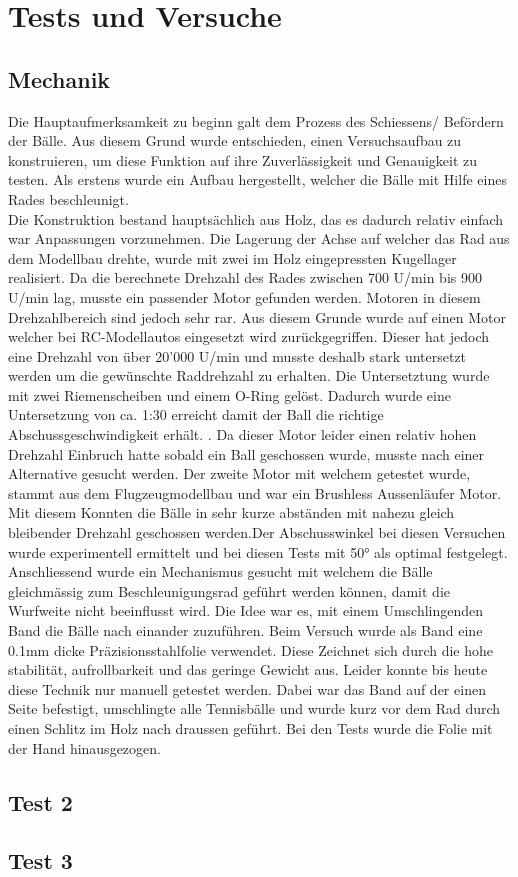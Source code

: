 \section{Tests und Versuche}

\subsection{Mechanik}


Die Hauptaufmerksamkeit zu beginn galt dem Prozess des Schiessens/ Befördern der Bälle. Aus diesem Grund wurde entschieden, einen Versuchsaufbau zu konstruieren, um diese Funktion auf ihre Zuverlässigkeit und Genauigkeit zu testen. Als erstens wurde ein Aufbau hergestellt, welcher die Bälle mit Hilfe eines Rades beschleunigt.
%
%
\\Die Konstruktion bestand hauptsächlich aus Holz, das es dadurch relativ einfach war Anpassungen vorzunehmen. Die Lagerung der Achse auf welcher das Rad aus dem Modellbau drehte, wurde mit zwei im Holz eingepressten Kugellager realisiert. Da die berechnete Drehzahl des Rades zwischen 700 U/min bis 900 U/min lag, musste ein passender Motor gefunden werden. Motoren in diesem Drehzahlbereich sind jedoch sehr rar. Aus diesem Grunde wurde auf einen Motor welcher bei RC-Modellautos eingesetzt wird zurückgegriffen. Dieser hat jedoch eine Drehzahl von über 20'000 U/min und musste deshalb stark untersetzt werden um die gewünschte Raddrehzahl zu erhalten. Die Untersetztung wurde mit zwei Riemenscheiben und einem O-Ring gelöst. Dadurch wurde eine Untersetzung von ca. 1:30 erreicht damit der Ball die richtige Abschussgeschwindigkeit erhält. . Da dieser Motor leider einen relativ hohen Drehzahl Einbruch hatte sobald ein Ball geschossen wurde, musste nach einer Alternative gesucht werden. Der zweite Motor mit welchem getestet wurde, stammt aus dem Flugzeugmodellbau und war ein Brushless Aussenläufer Motor. Mit diesem Konnten die Bälle in sehr kurze abständen mit nahezu gleich bleibender Drehzahl geschossen werden.Der Abschusswinkel bei diesen Versuchen wurde experimentell ermittelt und bei diesen Tests mit 50° als optimal festgelegt. 
%
%
\\Anschliessend wurde ein Mechanismus gesucht mit welchem die Bälle gleichmässig zum Beschleunigungsrad geführt werden können, damit die Wurfweite nicht beeinflusst wird. Die Idee war es, mit einem Umschlingenden Band die Bälle nach einander zuzuführen. Beim Versuch wurde als Band eine 0.1mm dicke Präzisionsstahlfolie verwendet. Diese Zeichnet sich durch die hohe stabilität, aufrollbarkeit und das geringe Gewicht aus. Leider konnte bis heute diese Technik nur manuell getestet werden. Dabei war das Band auf der einen Seite befestigt, umschlingte alle Tennisbälle und wurde kurz vor dem Rad durch einen Schlitz im Holz nach draussen geführt. Bei den Tests wurde die Folie mit der Hand hinausgezogen. 




\subsection{Test 2}

\subsection{Test 3}